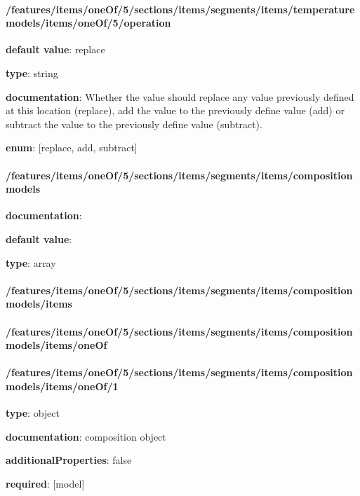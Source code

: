 \begin{itemized}
\end{itemized}\paragraph{/features/items/oneOf/5/sections/items/segments/items/temperature models/items/oneOf/5/operation} \begin{itemized}
\item {\bf default value}: replace
\item {\bf type}: string
\item {\bf documentation}: Whether the value should replace any value previously defined at this location (replace), add the value to the previously define value (add) or subtract the value to the previously define value (subtract).
\item {\bf enum}: [replace, add, subtract]\end{itemized}\paragraph{/features/items/oneOf/5/sections/items/segments/items/composition models} \begin{itemized}
\item {\bf documentation}: 
\item {\bf default value}: 
\item {\bf type}: array
\paragraph{/features/items/oneOf/5/sections/items/segments/items/composition models/items} \begin{itemized}
\end{itemized}\end{itemized}\paragraph{/features/items/oneOf/5/sections/items/segments/items/composition models/items/oneOf} \begin{itemized}
\end{itemized}\paragraph{/features/items/oneOf/5/sections/items/segments/items/composition models/items/oneOf/1} \begin{itemized}
\item {\bf type}: object
\item {\bf documentation}: composition object
\item {\bf additionalProperties}: false
\item {\bf required}: [model]\end{itemized}
